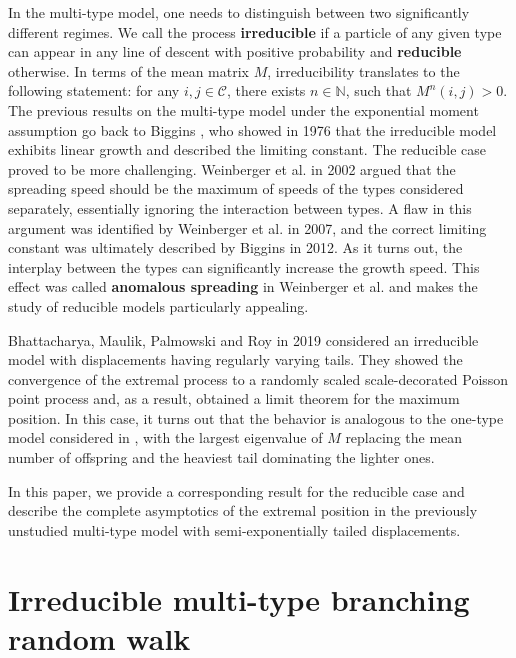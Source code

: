 \documentclass[12pt]{article}
\numberwithin{equation}{section}
\begin{document}
In the multi-type model, one needs to distinguish between two significantly different regimes. We call the process \textbf{irreducible} if a particle of any given type can appear in any line of descent with positive probability and \textbf{reducible} otherwise. In terms of the mean matrix $M$, irreducibility translates to the following statement: for any $i,j \in \mathcal{C}$, there exists $n \in \mathbb{N}$, such that $M^n(i,j) > 0$. The previous results on the multi-type model under the exponential moment assumption go back to Biggins \cite{Biggins1976}, who showed in 1976 that the irreducible model exhibits linear growth and described the limiting constant. The reducible case proved to be more challenging. Weinberger et al.\cite{Weinberger2002} in 2002 argued that the spreading speed should be the maximum of speeds of the types considered separately, essentially ignoring the interaction between types. A flaw in this argument was identified by Weinberger et al. \cite{Weinberger2007} in 2007, and the correct limiting constant was ultimately described by Biggins \cite{Biggins2012} in 2012. As it turns out, the interplay between the types can significantly increase the growth speed. This effect was called \textbf{ anomalous spreading} in Weinberger et al. \cite{Weinberger2007} and makes the study of reducible models particularly appealing.

Bhattacharya, Maulik, Palmowski and Roy \cite{Palmowski} in 2019 considered an irreducible model with displacements having regularly varying tails. They showed the convergence of the extremal process to a randomly scaled scale-decorated Poisson point process and, as a result, obtained a limit theorem for the maximum position. In this case, it turns out that the behavior is analogous to the one-type model considered in \cite{Durrett1983}, with the largest eigenvalue of $M$ replacing the mean number of offspring and the heaviest tail dominating the lighter ones. 

In this paper, we provide a corresponding result for the reducible case and describe the complete asymptotics of the extremal position in the previously unstudied multi-type model with semi-exponentially tailed displacements.

\section{Irreducible multi-type branching random walk}
\end{document}
